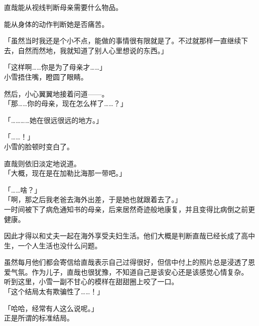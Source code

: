 直哉能从视线判断母亲需要什么物品。

能从身体的动作判断她是否痛苦。

「虽然当时我还是个小不点，能做的事情很有限就是了。不过就那样一直继续下去，自然而然地，我就知道了别人心里想说的东西。」

「这样啊……你是为了母亲才……」\\

小雪捂住嘴，瞪圆了眼睛。

然后，小心翼翼地接着问道——。\\

「那……你的母亲，现在怎么样了……？」

「…………她在很远很远的地方。」

「……！」\\

小雪的脸顿时变白了。

直哉则依旧淡定地说道。\\

「大概，现在是在加勒比海那一带吧。」

「……啥？」\\

「啊，那之后我老爸去海外出差，于是她也就跟着去了。」\\

一时间被下了病危通知书的母亲，后来居然奇迹般地康复，并且变得比病倒之前更健康。

因此才得以和丈夫一起在海外享受夫妇生活。他们大概是判断直哉已经长成了高中生，一个人生活也没什么问题。

虽然每月他们都会寄信给直哉表示自己过得很好，但信中付上的照片总是浸透了恩爱气氛。作为儿子，直哉也很犹豫，不知道自己是该安心还是该感觉心情复杂。\\

听到这里，小雪一副不甘心的模样在甜甜圈上咬了一口。\\

「这个结局太有欺骗性了……！」

「哈哈，经常有人这么说呢。」\\

正是所谓的标准结局。